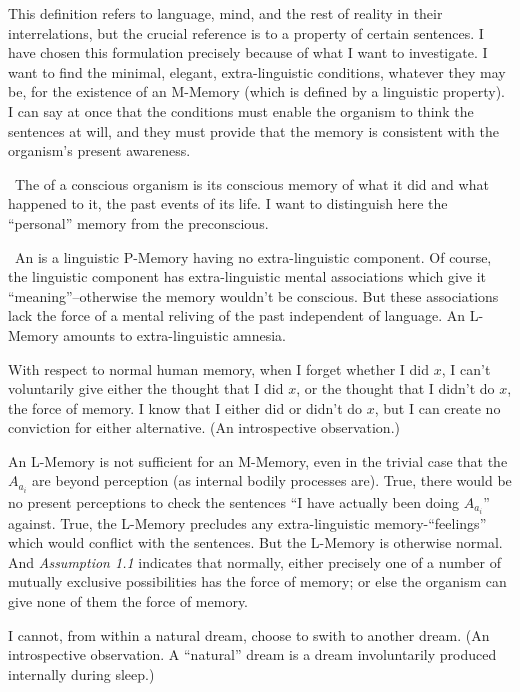 This definition refers to language, mind, and the rest of reality in their 
interrelations, but the crucial reference is to a property of certain sentences. 
I have chosen this formulation precisely because of what I want to 
investigate. I want to find the minimal, elegant, extra-linguistic conditions, 
whatever they may be, for the existence of an M-Memory (which is defined 
by a linguistic property). I can say at once that the conditions must enable 
the organism to think the sentences at will, and they must provide that the 
memory is consistent with the organism's present awareness. 

\begin{hangers}
\ The  of a conscious organism is its conscious 
memory of what it did and what happened to it, the past events of its life. I 
want to distinguish here the \enquote{personal} memory from the preconscious. 

\ An  is a linguistic P-Memory having no 
extra-linguistic component. Of course, the linguistic component has 
extra-linguistic mental associations which give it \enquote{meaning}--otherwise the 
memory wouldn't be conscious. But these associations lack the force of a 
mental reliving of the past independent of language. An L-Memory amounts 
to extra-linguistic amnesia. 

 With respect to normal human memory, when I forget 
whether I did $x$, I can't voluntarily give either the thought that I did $x$, or 
the thought that I didn't do $x$, the force of memory. I know that I either did 
or didn't do $x$, but I can create no conviction for either alternative. (An 
introspective observation.) 

 An L-Memory is not sufficient for an M-Memory, even 
in the trivial case that the $A_{a_i}$ are beyond perception (as internal bodily 
processes are). True, there would be no present perceptions to check the 
sentences \enquote{I have actually been doing $A_{a_i}$} against. True, the L-Memory 
precludes any extra-linguistic memory-\enquote{feelings} which would conflict with 
the sentences. But the L-Memory is otherwise normal. And \textit{Assumption 1.1}
indicates that normally, either precisely one of a number of mutually 
exclusive possibilities has the force of memory; or else the organism can give 
none of them the force of memory. 

 I cannot, from within a natural dream, choose to swith 
to another dream. (An introspective observation. A \enquote{natural} dream is a 
dream involuntarily produced internally during sleep.) 


\end{hangers}
